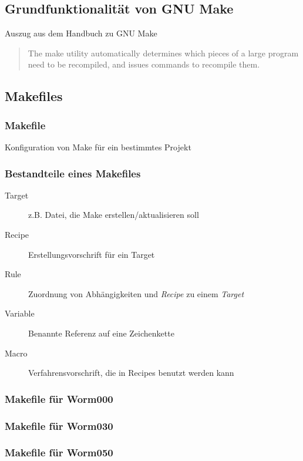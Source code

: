 \subsection{Grundfunktionalität von GNU Make}
\begin{frame}
Auszug aus dem Handbuch zu GNU Make
\begin{quote}
The make utility automatically determines which pieces of a large program need to be recompiled, and issues commands to recompile them.
\end{quote}
\end{frame}

\subsection{Makefiles}
\begin{frame}
\frametitle{Makefile} Konfiguration von Make für ein bestimmtes Projekt
\end{frame}

\begin{frame}
\frametitle{Bestandteile eines Makefiles}
\begin{description}
	\item[Target] z.B. Datei, die Make erstellen/aktualisieren soll
	\item[Recipe] Erstellungsvorschrift für ein Target
	\item[Rule] Zuordnung von Abhängigkeiten und \emph{Recipe} zu einem \emph{Target}
	\item[Variable] Benannte Referenz auf eine Zeichenkette
	\item[Macro] Verfahrensvorschrift, die in Recipes benutzt werden kann
\end{description}
\end{frame}

\begin{frame}[allowframebreaks]
	\frametitle{Makefile für Worm000}
\end{frame}

\begin{frame}[allowframebreaks]
	\frametitle{Makefile für Worm030}
\end{frame}

\begin{frame}[allowframebreaks]
	\frametitle{Makefile für Worm050}
\end{frame}

